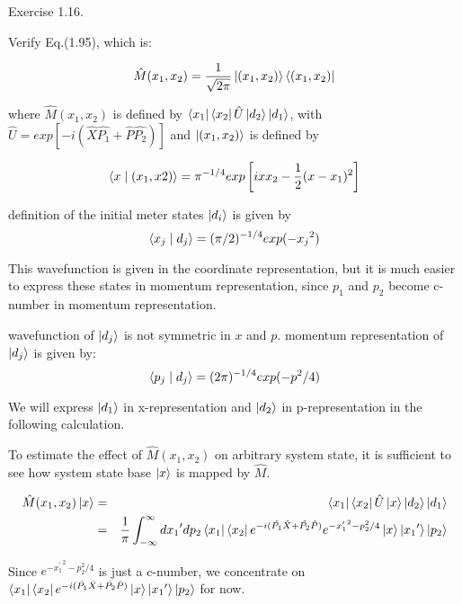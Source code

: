 \documentclass[uplatex]{jsarticle}
\begin{document}
Exercise 1.16.

Verify Eq.(1.95), which is:

\begin{equation}
\hat{M}(x_1, x_2) = \frac{1}{\sqrt{2 \pi}}
 \ket{(x_1, x_2)}\bra{(x_1, x_2)}
\label{eq:target}
\end{equation}

where $\hat{M}(x_1, x_2)$ is defined by
$\bra{x_1}\bra{x_2}\hat{U}\ket{d_2}\ket{d_1}$, with
$\hat{U} = exp\left[-i(\hat{X}\hat{P_1} + \hat{P}\hat{P_2})\right]$
and $\ket{(x_1, x_2)}$ is defined by

\begin{equation}
\braket{x \mid (x_1, x2)} = 
\pi^{-1/4} exp\left[ ixx_2 - \frac{1}{2} (x - x_1)^2\right]
\end{equation}

definition of the initial meter states $\ket{d_i}$ is given by 
\begin{equation}
\braket{x_j \mid d_j} = (\pi / 2)^{-1/4} exp (-{x_j}^2)
\end{equation}

This wavefunction is given in the coordinate representation, but it is
much easier to express these states in momentum representation, since
$p_1$ and $p_2$ become c-number in momentum representation.

wavefunction of $\ket{d_j}$ is not symmetric in $x$ and $p$. momentum
representation of $\ket{d_j}$ is given by:
\begin{equation}
\braket{p_j \mid d_j} = (2\pi)^{-1/4} exp(-p^2/4)
\end{equation}

We will express $\ket{d_1}$ in x-representation and $\ket{d_2}$ in
p-representation in the following calculation.

To estimate the effect of $\hat{M}(x_1, x_2)$ on arbitrary system state,
it is sufficient to see how system state base $\ket{x}$ is mapped by
$\hat{M}$.

\begin{eqnarray}
\hat{M}(x_1, x_2)\ket{x} &=& 
\bra{x_1}\bra{x_2}\hat{U}\ket{x}\ket{d_2}\ket{d_1} \nonumber \\
&=& \frac{1}{\pi} \int_{-\infty}^{\infty} {dx_1}^\prime dp_2 
\bra{x_1}\bra{x_2}e^{-i(\hat{P_1}\hat{X} + \hat{P_2}\hat{P})} 
e^{-{x_1^\prime}^2 - p_2^2 / 4}\ket{x}\ket{{x_1}^\prime}\ket{p_2}\\
\end{eqnarray}

Since $e^{-{x_1^\prime}^2 - p_2^2 / 4}$ is just a c-number, we
concentrate on $\bra{x_1}\bra{x_2}e^{-i(\hat{P_1}\hat{X} + \hat{P_2}\hat{P})} 
\ket{x}\ket{{x_1}^\prime}\ket{p_2}$ for now.
\end{document}
